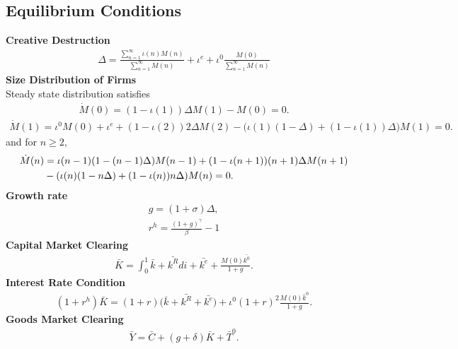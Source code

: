 \documentclass[a4paper,12pt]{article}
\begin{document}
\subsection*{Equilibrium Conditions}
\textbf{Creative Destruction}\\
\begin{align}
    \Delta = \frac{\sum_{n=1}^\infty \iota(n)M(n)}{\sum_{n=1}^\infty M(n)}+ \iota^e + \iota^0 \frac{M(0)}{\sum_{n=1}^{\infty}M(n)}
\end{align}
\textbf{Size Distribution of Firms}\\
Steady state distribution satisfies
\begin{align}
    \dot{M}(0) = (1-\iota(1))\Delta M(1) - M(0) = 0.
\end{align}
\begin{align}
    \dot{M}(1) = \iota^0 M(0) + \iota^e+(1-\iota(2))2\Delta M(2)-\big(\iota(1)(1-\Delta)+ (1-\iota(1))\Delta \big)M(1) = 0.
\end{align}
and for $n\geq 2$,
\begin{align}
    \dot{M}(n) &= \iota(n-1)(1-(n-1)\Delta)M(n-1)+(1-\iota(n+1))(n+1)\Delta M(n+1) \notag\\
    &- (\iota(n)(1-n\Delta) + (1-\iota(n))n \Delta )M(n) =0.
\end{align}
\textbf{Growth rate}
\begin{align}
g = (1+\sigma) \Delta,\\
 r^h = \frac{(1+g)^\gamma }{\beta} - 1
\end{align}
\textbf{Capital Market Clearing}\\
\begin{align}
    \bar{K} = \int_0^1 \bar{k} + \bar{k^R} di + \bar{k^e} + \frac{M(0)\bar{k^0}}{1+g}.
\end{align}
\textbf{Interest Rate Condition}\\
\begin{align}
    (1+r^h)\bar{K} = (1+r)\Big(\bar{k}+ \bar{k^R}  + \bar{k^e} \Big) + \iota^0(1+r)^2 \frac{M(0)\bar{k}^0}{1+g}.
\end{align}
\textbf{Goods Market Clearing}\\
\begin{align}
    \bar{Y} = \bar{C} + (g+\delta)\bar{K} + \bar{T}^0.
\end{align}
\end{document}
